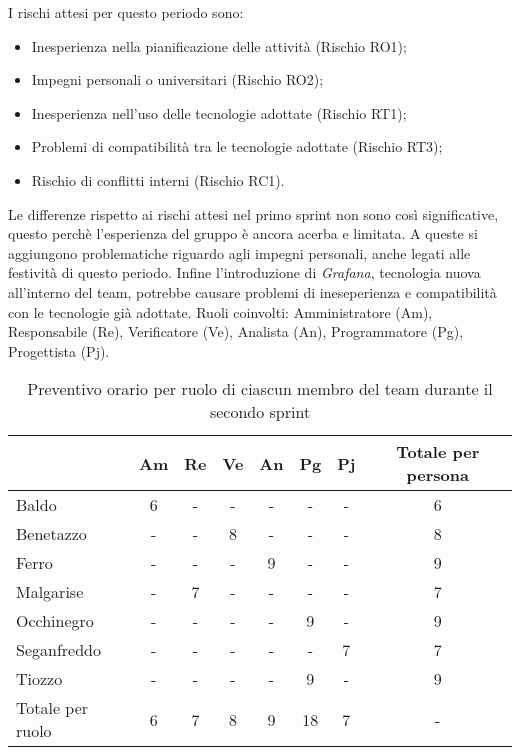     I rischi attesi per questo periodo sono:
    \begin{itemize}
        \item Inesperienza nella pianificazione delle attività (Rischio RO1);
        \item Impegni personali o universitari (Rischio RO2);
        \item Inesperienza nell'uso delle tecnologie adottate (Rischio RT1);
        \item Problemi di compatibilità tra le tecnologie adottate (Rischio RT3);
        \item Rischio di conflitti interni (Rischio RC1).
    \end{itemize}
    Le differenze rispetto ai rischi attesi nel primo sprint non sono così significative, questo perchè l'esperienza del gruppo è ancora acerba e limitata.
    A queste si aggiungono problematiche riguardo agli impegni personali, anche legati alle festività di questo periodo. Infine l'introduzione di \textit{Grafana},
    tecnologia nuova all'interno del team, potrebbe causare problemi di ineseperienza e compatibilità con le tecnologie già adottate.
    \newpage
    Ruoli coinvolti: Amministratore (Am), Responsabile (Re), Verificatore (Ve), Analista (An),
    Programmatore (Pg), Progettista (Pj).
    \begin{table}[!h]
        \centering
        \begin{tabular}{ |l| c | c | c | c | c | c | c |} 
            \hline
            \textbf{} & \textbf{Am} & \textbf{Re} & \textbf{Ve} &\textbf{An} & \textbf{Pg} & \textbf{Pj} & \textbf{Totale per persona} \\
            \hline 
            Baldo       & 6 & - & - & - & - & - & 6   \\ 
            Benetazzo   & - & - & 8 & - & - & - & 8   \\ 
            Ferro       & - & - & - & 9 & - & - & 9   \\ 
            Malgarise   & - & 7 & - & - & - & - & 7   \\ 
            Occhinegro  & - & - & - & - & 9 & - & 9   \\ 
            Seganfreddo & - & - & - & - & - & 7 & 7   \\
            Tiozzo      & - & - & - & - & 9 & - & 9   \\ 
            \hline
            Totale per ruolo & 6 & 7 & 8 & 9 & 18 & 7 & - \\
            \hline
        \end{tabular}
        \caption{Preventivo orario per ruolo di ciascun membro del team durante il secondo sprint}
        \label{tab:5}
    \end{table}
